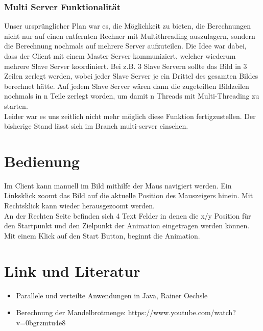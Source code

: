 \documentclass{article}
\begin{document}
	\subsubsection{Multi Server Funktionalität}
	Unser ursprünglicher Plan war es, die Möglichkeit zu bieten, die Berechnungen nicht nur auf einen entfernten Rechner
	mit Multithreading auszulagern, sondern die Berechnung nochmals auf mehrere Server aufzuteilen.
	Die Idee war dabei, dass der Client mit einem Master Server kommuniziert, welcher wiederum mehrere Slave Server koordiniert.
	Bei z.B. 3 Slave Servern sollte das Bild in 3 Zeilen zerlegt werden, wobei jeder Slave Server je ein Drittel des gesamten Bildes
	berechnet hätte.
	Auf jedem Slave Server wären dann die zugeteilten Bildzeilen nochmals in n Teile zerlegt worden, um damit n Threads mit Multi-Threading
	zu starten.\\
	Leider war es uns zeitlich nicht mehr möglich diese Funktion fertigzustellen.
	Der bisherige Stand lässt sich im Branch multi-server einsehen.
	
	\section{Bedienung}
	Im Client kann manuell im Bild mithilfe der Maus navigiert werden. Ein Linksklick zoomt das Bild auf die aktuelle Position des Mauszeigers hinein.
	Mit Rechtsklick kann wieder herausgezoomt werden.\\
	An der Rechten Seite befinden sich 4 Text Felder in denen die x/y Position für den Startpunkt und den Zielpunkt der Animation eingetragen werden
	können. Mit einem Klick auf den Start Button, beginnt die Animation.
	
	
	
	\newpage
	\section{Link und Literatur}
	\begin{itemize}
		\item Parallele und verteilte Anwendungen in Java, Rainer Oechsle
		\item Berechnung der Mandelbrotmenge: https://www.youtube.com/watch?v=0bgrzmtu4e8
	\end{itemize}
\end{document}
